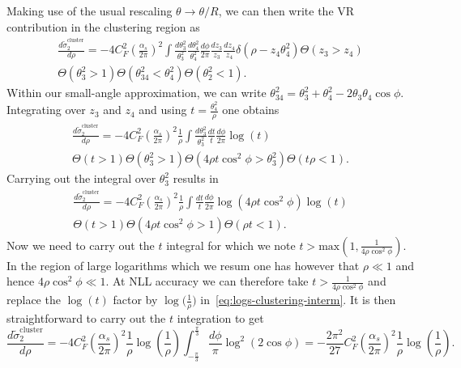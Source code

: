 Making use of the usual rescaling $\theta \to \theta/R$, we can then write the VR contribution in the clustering region as
\begin{multline} 
\frac{ d \tilde{\sigma}_2^{\mathrm{cluster}}}{d \rho}=-4 C_F^2 \left(\frac{\alpha_s}{2\pi}\right)^2 \int \frac{d\theta_3^2}{\theta_3^2}\frac{d\theta_4^2}{\theta_4^2} \frac{d\phi}{2\pi} \frac{d z_3}{z_3} \frac{dz_4}{z_4} \delta \left(\rho -z_4 \theta_4^2 \right)\Theta(z_3>z_4) \\  \Theta\left(\theta_3^2>1\right) \Theta \left(\theta_{34}^2<\theta_4^2\right)\Theta \left(\theta_{2}^2<1\right).
\end{multline}
%
Within our small-angle approximation, we can write
$\theta_{34}^2 =\theta_3^2 +\theta_4^2-2 \theta_3 \theta_4 \cos \phi$.
%
Integrating over $z_3$ and $z_4$ and using
$t= \frac{\theta_4^2}{\rho}$ one obtains
 \begin{multline} 
\frac{ d \tilde{\sigma}_2^{\mathrm{cluster}}}{d \rho}= -4 C_F^2 \left( \frac{\alpha_s}{2\pi} \right)^2 \frac{1}{\rho} \int \frac{d\theta_3^2}{\theta_3^2} \frac{dt}{t} \frac{d \phi}{2 \pi} \log(t) \\
 \Theta \left(t>1\right) \Theta \left(\theta_3^2>1\right) \Theta\left(4 \rho t \cos^2\phi>\theta_3^2\right)\Theta \left(t \rho<1 \right).
\end{multline}
Carrying out the integral over $\theta_3^2$ results in 
\begin{multline}\label{eq:logs-clustering-interm}
\frac{ d \tilde{\sigma}_2^{\mathrm{cluster}}}{d \rho}= -4 C_F^2 \left( \frac{\alpha_s}{2\pi} \right)^2 \frac{1}{\rho} \int \frac{dt}{t} \frac{d \phi}{2 \pi} \log \left(4 \rho t \cos^2 \phi \right) \log(t) 
\\ \Theta \left(t>1\right) \Theta\left(4 \rho t \cos^2\phi>1\right)\Theta \left(\rho t <1\right).
\end{multline}
Now we need to carry out the $t$ integral for which we note
$t > \mathrm{max}\left(1, \frac{1}{4\rho\cos^2 \phi}\right)$. In the
region of large logarithms which we resum one has however that
$\rho \ll 1$ and hence $4\rho\cos^2 \phi\ll 1$.
%
At NLL accuracy we can therefore take $t>\frac{1}{4\rho\cos^2 \phi}$
and replace the $\log(t)$ factor by $\log \big(\tfrac{1}{\rho}\big)$ in~\eqref{eq:logs-clustering-interm}.
%
%
It is then straightforward to carry out the $t$ integration to get
\begin{equation} 
 \frac{ d \tilde{\sigma}_2^{\mathrm{cluster}}}{d \rho}
 = -4 C_F^2 \left( \frac{\alpha_s}{2\pi} \right)^2 \frac{1}{\rho} \log\left(\frac{1}{\rho}\right) \int_{-\frac{\pi}{3}}^{\frac{\pi}{3}} \frac{d \phi}{\pi} \log^2(2 \cos \phi) = -\frac{2\pi^2}{27} C_F^2 \left( \frac{\alpha_s}{2\pi} \right)^2 \frac{1}{\rho} \log \left(\frac{1}{\rho}\right).
 \end{equation} 
